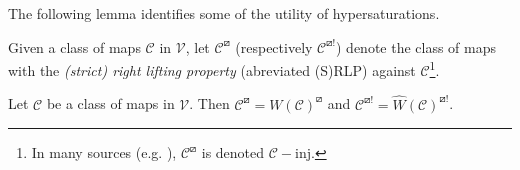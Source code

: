 \documentclass[a4paper,10pt,draft]{article}%
\begin{document}
The following lemma identifies some of the utility of hypersaturations.
\begin{notation}
      Given a class of maps $\mathcal C$ in $\mathcal V$, let $\mathcal C^\boxslash$ (respectively $\mathcal C^{\boxslash !}$)
      denote the class of maps with the
      \textit{(strict) right lifting property} (abreviated (S)RLP) against $\mathcal C$\footnote{
        In many sources (e.g. \cite{Hov99}), $\mathcal C^\boxslash$ is denoted $\mathcal C - \mbox{inj}$.
      }.
\end{notation}
\begin{lemma}
      \label{HYPER_LP_LEM}
      Let $\mathcal C$ be a class of maps in $\mathcal V$. Then
      $\mathcal C^{\boxslash}= W(\mathcal C)^{\boxslash}$
      and
      $\mathcal C^{\boxslash !} = \hat{W}(\mathcal C)^{\boxslash !}$.
\end{lemma}
\end{document}
